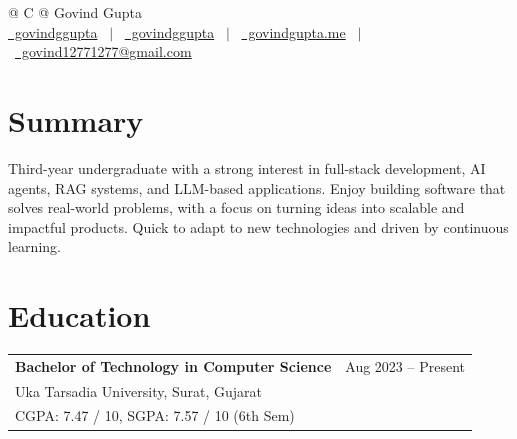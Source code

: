 \documentclass[a4paper,12pt]{article}
\begin{document}
\pagestyle{empty} 

\begin{tabularx}{\linewidth}{@{} C @{}}
\Huge{Govind Gupta} \\[7.5pt]
\href{https://github.com/govindggupta}{\raisebox{-0.05\height}\faGithub\ govindggupta} \ $|$ \ 
\href{https://linkedin.com/in/govindggupta}{\raisebox{-0.05\height}\faLinkedin\ govindggupta} \ $|$ \ 
\href{https://govindgupta.me}{\raisebox{-0.05\height}\faGlobe \ govindgupta.me} \ $|$ \ 
\href{mailto:govind12771277@gmail.com }{\raisebox{-0.05\height}\faEnvelope \ govind12771277@gmail.com} \\
\end{tabularx}

\section{Summary}
Third-year undergraduate with a strong interest in full-stack development, AI agents, RAG systems, and LLM-based applications. Enjoy building software that solves real-world problems, with a focus on turning ideas into scalable and impactful products. Quick to adapt to new technologies and driven by continuous learning.

\section{Education}
\begin{tabularx}{\linewidth}{@{}X r@{}}	
\textbf{Bachelor of Technology in Computer Science} & Aug 2023 -- Present \\
Uka Tarsadia University, Surat, Gujarat & \\
CGPA: 7.47 / 10, SGPA: 7.57 / 10 (6th Sem) & \\
\end{tabularx}

\end{document}
